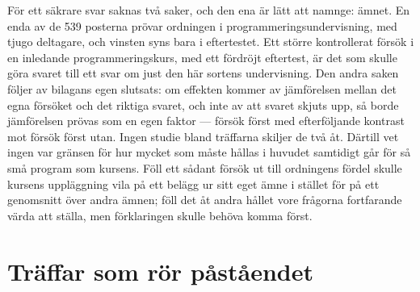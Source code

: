 För ett säkrare svar saknas två saker, och den ena är lätt att namnge:
ämnet.  En enda av de 539 posterna prövar ordningen i
programmeringsundervisning, med tjugo deltagare, och vinsten syns bara i
eftertestet.  Ett större kontrollerat försök i en inledande
programmeringskurs, med ett fördröjt eftertest, är det som skulle göra
svaret till ett svar om just den här sortens undervisning.  Den andra
saken följer av bilagans egen slutsats: om effekten kommer av
jämförelsen mellan det egna försöket och det riktiga svaret, och inte av
att svaret skjuts upp, så borde jämförelsen prövas som en egen faktor
--- försök först med efterföljande kontrast mot försök först utan.
Ingen studie bland träffarna skiljer de två åt.  Därtill vet ingen var
gränsen för hur mycket som måste hållas i huvudet samtidigt går för så
små program som kursens.  Föll ett sådant försök ut
till ordningens fördel skulle kursens uppläggning vila på ett belägg
ur sitt eget ämne i stället för på ett genomsnitt över andra ämnen; föll
det åt andra hållet vore frågorna fortfarande värda att ställa, men
förklaringen skulle behöva komma först.

\section{Träffar som rör påståendet}
\label{sec:pf-traffar}

